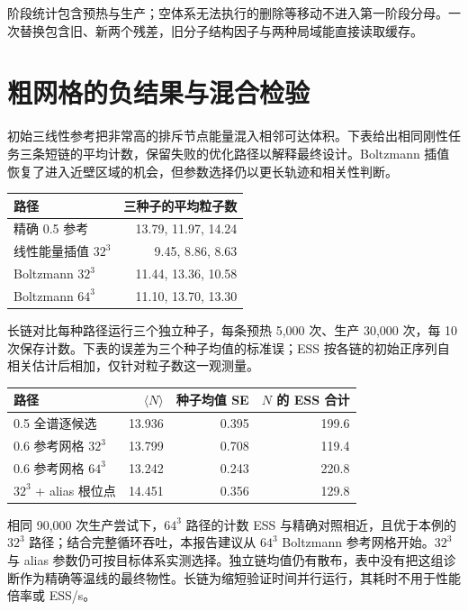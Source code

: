 阶段统计包含预热与生产；空体系无法执行的删除等移动不进入第一阶段分母。一次替换包含旧、新两个残差，旧分子结构因子与两种局域能直接读取缓存。

\section{粗网格的负结果与混合检验}

初始三线性参考把非常高的排斥节点能量混入相邻可达体积。下表给出相同刚性任务三条短链的平均计数，保留失败的优化路径以解释最终设计。Boltzmann 插值恢复了进入近壁区域的机会，但参数选择仍以更长轨迹和相关性判断。

\begin{center}\small
\begin{tabular}{@{}lr@{}}\toprule
路径 & 三种子的平均粒子数\\\midrule
精确 0.5 参考 & 13.79, 11.97, 14.24\\
线性能量插值 $32^3$ & 9.45, 8.86, 8.63\\
Boltzmann $32^3$ & 11.44, 13.36, 10.58\\
Boltzmann $64^3$ & 11.10, 13.70, 13.30\\
\bottomrule\end{tabular}\end{center}

长链对比每种路径运行三个独立种子，每条预热 5,000 次、生产 30,000 次，每 10 次保存计数。下表的误差为三个种子均值的标准误；ESS 按各链的初始正序列自相关估计后相加，仅针对粒子数这一观测量。

\begin{center}\small
\begin{tabular}{@{}lrrr@{}}\toprule
路径 & $\langle N\rangle$ & 种子均值 SE & $N$ 的 ESS 合计\\\midrule
0.5 全谱逐候选 & 13.936 & 0.395 & 199.6\\
0.6 参考网格 $32^3$ & 13.799 & 0.708 & 119.4\\
0.6 参考网格 $64^3$ & 13.242 & 0.243 & 220.8\\
$32^3$ + alias 根位点 & 14.451 & 0.356 & 129.8\\
\bottomrule\end{tabular}\end{center}

相同 90,000 次生产尝试下，$64^3$ 路径的计数 ESS 与精确对照相近，且优于本例的 $32^3$ 路径；结合完整循环吞吐，本报告建议从 $64^3$ Boltzmann 参考网格开始。$32^3$ 与 alias 参数仍可按目标体系实测选择。独立链均值仍有散布，表中没有把这组诊断作为精确等温线的最终物性。长链为缩短验证时间并行运行，其耗时不用于性能倍率或 ESS/s。

